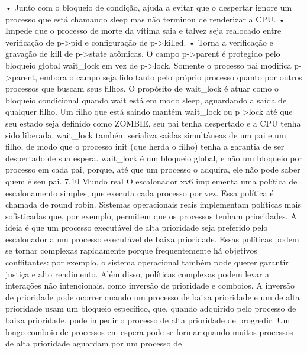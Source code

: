  •  Junto  com  o  bloqueio  de  condição,  ajuda  a  evitar  que  o  despertar  ignore  um  processo  que  está
 chamando  sleep  mas  não  terminou  de  renderizar  a  CPU.
 •  Impede  que  o  processo  de  morte  da  vítima  saia  e  talvez  seja  realocado  entre
 verificação  de  p->pid  e  configuração  de  p->killed.
 •  Torna  a  verificação  e  gravação  de  kill  de  p->state  atômicas.
 O  campo  p->parent  é  protegido  pelo  bloqueio  global  wait_lock  em  vez  de  p->lock.
 Somente  o  processo  pai  modifica  p->parent,  embora  o  campo  seja  lido  tanto  pelo  próprio  processo  quanto  por  
outros  processos  que  buscam  seus  filhos.  O  propósito  de  wait_lock  é  atuar  como  o  bloqueio  condicional  quando  
wait  está  em  modo  sleep,  aguardando  a  saída  de  qualquer  filho.  Um  filho  que  está  saindo  mantém  wait_lock  ou  p
>lock  até  que  seu  estado  seja  definido  como  ZOMBIE,  seu  pai  tenha  despertado  e  a  CPU  tenha  sido  liberada.  
wait_lock  também  serializa  saídas  simultâneas  de  um  pai  e  um  filho,  de  modo  que  o  processo  init  (que  herda  o  
filho)  tenha  a  garantia  de  ser  despertado  de  sua  espera.  wait_lock  é  um  bloqueio  global,  e  não  um  bloqueio  por  
processo  em  cada  pai,  porque,  até  que  um  processo  o  adquira,  ele  não  pode  saber  quem  é  seu  pai.
 7.10  Mundo  real
 O  escalonador  xv6  implementa  uma  política  de  escalonamento  simples,  que  executa  cada  processo  por  vez.  Essa  
política  é  chamada  de  round  robin.  Sistemas  operacionais  reais  implementam  políticas  mais  sofisticadas  que,  por  
exemplo,  permitem  que  os  processos  tenham  prioridades.  A  ideia  é  que  um  processo  executável  de  alta  prioridade  
seja  preferido  pelo  escalonador  a  um  processo  executável  de  baixa  prioridade.  Essas  políticas  podem  se  tornar  
complexas  rapidamente  porque  frequentemente  há  objetivos  conflitantes:  por  exemplo,  o  sistema  operacional  
também  pode  querer  garantir  justiça  e  alto  rendimento.  Além  disso,  políticas  complexas  podem  levar  a  interações  
não  intencionais,  como  inversão  de  prioridade  e  comboios.  A  inversão  de  prioridade  pode  ocorrer  quando  um  
processo  de  baixa  prioridade  e  um  de  alta  prioridade  usam  um  bloqueio  específico,  que,  quando  adquirido  pelo  
processo  de  baixa  prioridade,  pode  impedir  o  processo  de  alta  prioridade  de  progredir.  Um  longo  comboio  de  
processos  em  espera  pode  se  formar  quando  muitos  processos  de  alta  prioridade  aguardam  por  um  processo  de  
